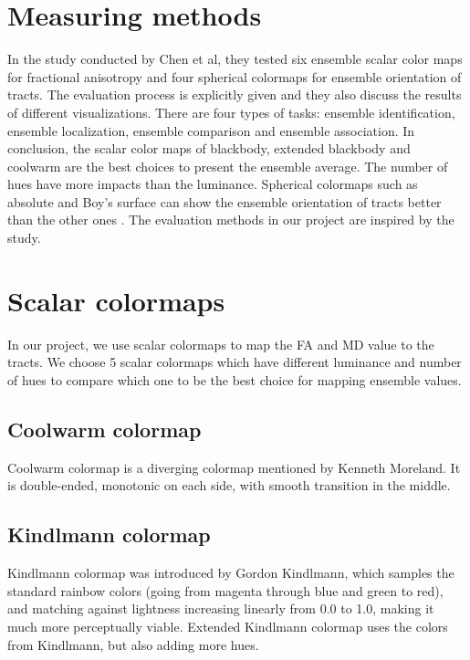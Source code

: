 \documentclass[hyperref, plainreport, noproblem]{cgvpub1}
\begin{document}
\section{Measuring methods}
In the study conducted by Chen et al, they tested six ensemble scalar color maps for fractional anisotropy and four spherical colormaps for ensemble orientation of tracts. The evaluation process is explicitly given and they also discuss the results of different visualizations. There are four types of tasks: ensemble identification, ensemble localization, ensemble comparison and ensemble association. In conclusion, the scalar color maps of blackbody, extended blackbody and coolwarm are the best choices to present the ensemble average. The number of hues have more impacts than the luminance. Spherical colormaps such as absolute and Boy’s surface can show the ensemble orientation of tracts better than the other ones \cite{moreland2019}. The evaluation methods in our project are inspired by the study.


\section{Scalar colormaps}

In our project, we use scalar colormaps to map the FA and MD value to the tracts. We choose 5 scalar colormaps which have different luminance and number of hues to compare which one to be the best choice for mapping ensemble values.

\subsection{Coolwarm colormap}
Coolwarm colormap is a diverging colormap mentioned by Kenneth Moreland. It is double-ended, monotonic on each side, with smooth transition in the middle.

\subsection{Kindlmann colormap}
Kindlmann colormap was introduced by Gordon Kindlmann, which samples the standard rainbow colors (going from magenta through blue and green to red), and matching against lightness increasing linearly from 0.0 to 1.0, \cite{kindlmann} making it much more perceptually viable. Extended Kindlmann colormap uses the colors from Kindlmann, but also adding more hues.
\end{document}

